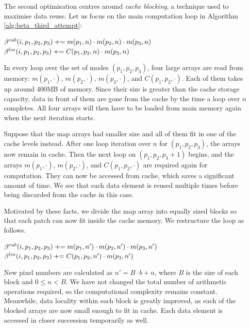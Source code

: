 The second optimisation centres around \textit{cache blocking}, a technique used to maximise data reuse. Let us focus on the main computation loop in Algorithm \ref{alg:beta_third_attempt}:

\begin{algorithmic}
			\State $\beta^{cub}(i, p_1, p_2, p_3) \mathrel{+}= m(p_1,n) \cdot m(p_2,n) \cdot m(p_3,n)$
			\State $\beta^{lin}(i, p_1, p_2, p_3) \mathrel{+}= C(p_1, p_2, n) \cdot m( p_3, n)$
		\EndFor
	\EndFor
\end{algorithmic}

In every loop over the set of modes $(p_1, p_2, p_3)$, four large arrays are read from memory: $m(p_1,\cdot)$, $m(p_2,\cdot)$, $m(p_3,\cdot)$, and $C(p_1, p_2, \cdot)$. Each of them takes up around 400MB of memory. Since their size is greater than the cache storage capacity, data in front of them are gone from the cache by the time a loop over $n$ completes. All four arrays will then have to be loaded from main memory again when the next iteration starts.

Suppose that the map arrays had smaller size and all of them fit in one of the cache levels instead. After one loop iteration over $n$ for $(p_1, p_2, p_3)$, the arrays now remain in cache. Then the next loop on $(p_1, p_2, p_3+1)$ begins, and the arrays $m(p_1,\cdot)$, $m(p_2,\cdot)$, and $C(p_1,p_2,\cdot)$ are required again for computation. They can now be accessed from cache, which saves a significant amount of time. We see that each data element is reused multiple times before being discarded from the cache in this case.

Motivated by these facts, we divide the map array into equally sized blocks so that each patch can now fit inside the cache memory. We restructure the loop as follows.

\begin{algorithmic}
				\State $\beta^{cub}(i, p_1, p_2, p_3) \mathrel{+}= m(p_1,n') \cdot m(p_2,n') \cdot m(p_3,n')$
				\State $\beta^{lin}(i, p_1, p_2, p_3) \mathrel{+}= C(p_1, p_2, n') \cdot m( p_3, n')$
			\EndFor
		\EndFor
	\EndFor
\end{algorithmic}

New pixel numbers are calculated as $n' = B \cdot b + n$, where $B$ is the size of each block and $0 \le n < B$. We have not changed the total number of arithmetic operations required, so the computational complexity remains constant. Meanwhile, data locality within each block is greatly improved, as each of the blocked arrays are now small enough to fit in cache. Each data element is accessed in closer succession temporarily as well.

